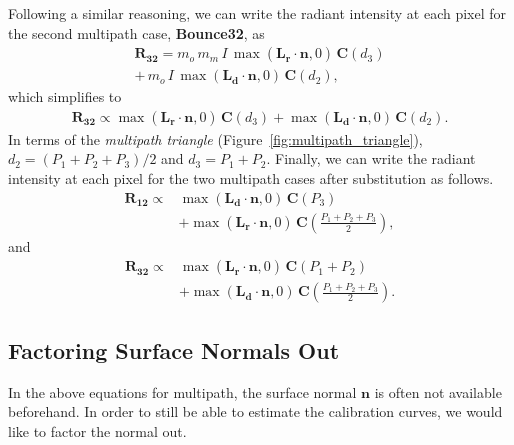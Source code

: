 Following a similar reasoning, we can write the radiant intensity at each pixel for the second multipath case, \textbf{Bounce32}, as
%
\begin{align}
\mathbf{R_{32}} = m_o \, m_m \, I \, \max{(\mathbf{L_r} \cdot \mathbf{n}, 0)} \, \mathbf{C}(d_3)\nonumber \\
					 + \, m_o \, I \, \max{(\mathbf{L_d} \cdot \mathbf{n}, 0)} \, \mathbf{C}(d_2),
\end{align}
%
which simplifies to
%
\begin{align}
\mathbf{R_{32}} \propto \max{(\mathbf{L_r} \cdot \mathbf{n}, 0)} \, \mathbf{C}(d_3)
					 + \max{(\mathbf{L_d} \cdot \mathbf{n}, 0)} \, \mathbf{C}(d_2).
\end{align}
%
In terms of the \emph{multipath triangle} (Figure~\ref{fig:multipath_triangle}), $d_2 = (P_1 + P_2 + P_3) / 2$ and $d_3 = P_1 + P_2.$
%
Finally, we can write the radiant intensity at each pixel for the two multipath cases after substitution as follows.
%
\begin{align}
\mathbf{R_{12}} \propto & \max{(\mathbf{L_d} \cdot \mathbf{n}, 0)} \, \mathbf{C}(P_3) \nonumber\\
					 & + \max{(\mathbf{L_r} \cdot \mathbf{n}, 0)} \, \mathbf{C}\left(\frac{P_1 + P_2 + P_3}{2}\right),
		\label{eqn:R12}
\end{align}
%
and
\begin{align}
%
\mathbf{R_{32}} \propto & \max{(\mathbf{L_r} \cdot \mathbf{n}, 0)} \, \mathbf{C}(P_1 + P_2)\nonumber\\
					& + \max{(\mathbf{L_d} \cdot \mathbf{n}, 0)} \, \mathbf{C}\left(\frac{P_1 + P_2 + P_3}{2}\right).
		\label{eqn:R32}
\end{align}
%

\subsection{Factoring Surface Normals Out}
In the above equations for multipath, the surface normal $\mathbf{n}$ is often not available beforehand.
In order to still be able to estimate the calibration curves, we would like to factor the normal out.

